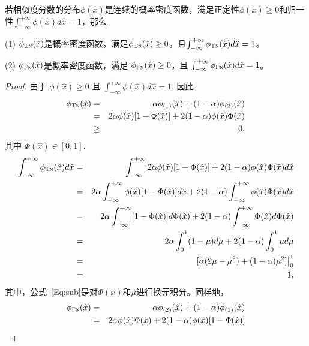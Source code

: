 \begin{lemma}[类条件概率密度]
若相似度分数的分布$\phi(\hat x)$是连续的概率密度函数，满足正定性$\phi(\hat x) \geq 0 $和归一性$\int_{-\infty}^{+\infty}\phi(\hat x) d\hat x =1 $，那么

(1) $\phi_{\textsc{Tn}}(\hat{x})$是概率密度函数，满足$\phi_{\textsc{Tn}}(\hat{x})\geq 0$，且$\int_{-\infty}^{+\infty}\phi_{\textsc{Tn}}(\hat{x})d\hat x =1 $。

(2) $\phi_{\textsc{Fn}}(\hat{x})$是概率密度函数，满足 $\phi_{\textsc{Fn}}(\hat{x})\geq 0$，且  $\int_{-\infty}^{+\infty}\phi_{\textsc{Fn}}(\hat{x})d\hat x =1 $。
\begin{proof}
由于 $\phi(\hat x) \geq 0 $ 且 $\int_{-\infty}^{+\infty}\phi(\hat x) d\hat x =1 $, 因此
	\begin{eqnarray}
		\phi_{\textsc{Tn}}(\hat{x}) &=& \alpha \phi_{(1)}(\hat{x}) + (1-\alpha)\phi_{(2)}(\hat{x}) \nonumber \\ 
		&=& 2\alpha\phi(\hat{x}) [1-\Phi(\hat{x})]+ 2(1-\alpha)\phi(\hat{x}) \Phi(\hat{x}) \nonumber \\ 
		&\geq& 0,
	\end{eqnarray}
其中 $\Phi(\hat{x}) \in [0,1]$. 
	\begin{eqnarray}
		\int_{-\infty}^{+\infty}\phi_{\textsc{Tn}}(\hat{x})d\hat x &=& \int_{-\infty}^{+\infty}2\alpha\phi(\hat{x}) [1-\Phi(\hat{x})]+ 2(1-\alpha)\phi(\hat{x}) \Phi(\hat{x}) d\hat x \nonumber \\
		&=&2\alpha\int_{-\infty}^{+\infty}\phi(\hat{x}) [1-\Phi(\hat{x})] d\hat x+  2(1-\alpha)\int_{-\infty}^{+\infty} \phi(\hat{x}) \Phi(\hat{x}) d\hat x \nonumber \\
		&=&2\alpha\int_{-\infty}^{+\infty} [1-\Phi(\hat{x})] d\Phi(\hat{x}) +  2(1-\alpha)\int_{-\infty}^{+\infty}  \Phi(\hat{x}) d\Phi(\hat{x}) \nonumber \\
		&=& 2\alpha\int_{0}^{1} (1-\mu) d\mu +  2(1-\alpha)\int_{0}^{1}  \mu d\mu  \label{Eq:sub}\\
		&=& [\alpha(2\mu-\mu^2) +(1-\alpha)\mu^2] \big|_0^1 \nonumber \\
		&=&1,
	\end{eqnarray}
其中，公式~\ref{Eq:sub}是对$\Phi(\hat{x})$和$\mu$进行换元积分。同样地，
	\begin{eqnarray}
		\phi_{\textsc{Fn}}(\hat{x}) &=& \alpha \phi_{(2)}(\hat{x}) + (1-\alpha)\phi_{(1)}(\hat{x}) \nonumber\\
		&=& 2\alpha \phi(\hat{x}) \Phi(\hat{x}) +2(1-\alpha)\phi(\hat{x}) [1-\Phi(\hat{x})] \nonumber \\ 

\end{eqnarray}
\end{proof}
\end{lemma}
